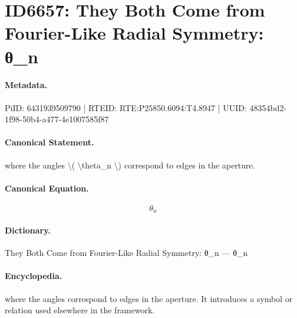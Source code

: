 \section*{ID6657: They Both Come from Fourier-Like Radial Symmetry: θ\_n}
\paragraph{Metadata.}
PiID: 6431939509790 | RTEID: RTE:P25850.6094:T4.8947 | UUID: 48354bd2-1f98-50b4-a477-4e1007585f87

\paragraph{Canonical Statement.}
where the angles \textbackslash{}( \textbackslash{}theta\_n \textbackslash{}) correspond to edges in the aperture.

\paragraph{Canonical Equation.}
\[
\theta_n
\]

\paragraph{Dictionary.}
They Both Come from Fourier-Like Radial Symmetry: θ\_n — θ\_n

\paragraph{Encyclopedia.}
where the angles correspond to edges in the aperture. It introduces a symbol or relation used elsewhere in the framework.
